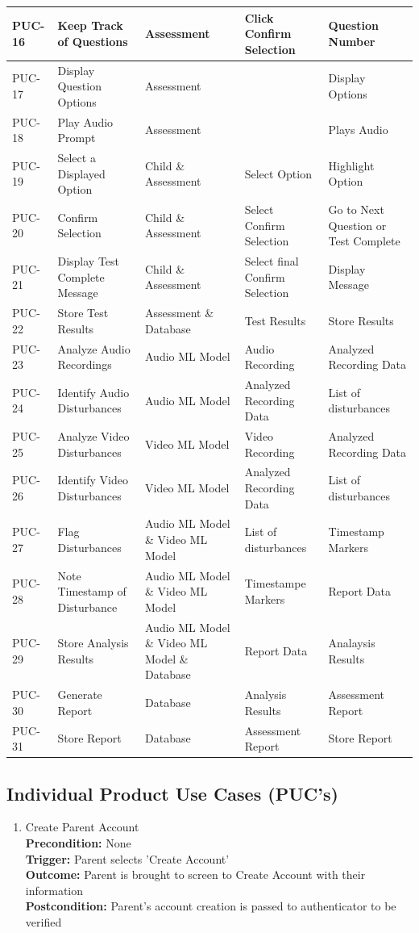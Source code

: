 \documentclass[12pt]{article}
\begin{document}
\begin{longtable}{|p{2cm}|p{3.2cm}|p{3.2cm}|p{3cm}|p{3cm}|}
  \hline
  PUC-16 & Keep Track of Questions & Assessment & Click Confirm Selection& Question Number\\
  \hline
  PUC-17 & Display Question Options & Assessment & & Display Options\\
  \hline
  PUC-18 & Play Audio Prompt & Assessment & & Plays Audio\\
  \hline
  PUC-19 & Select a Displayed Option & Child \& Assessment & Select Option & Highlight Option\\
  \hline
  PUC-20 & Confirm Selection & Child \& Assessment & Select Confirm Selection & Go to Next Question or Test Complete\\
  \hline
  PUC-21 & Display Test Complete Message & Child \& Assessment & Select final Confirm Selection & Display Message\\
  \hline
  PUC-22 & Store Test Results & Assessment \& Database & Test Results & Store Results\\
  \hline
  PUC-23 & Analyze Audio Recordings & Audio ML Model & Audio Recording & Analyzed Recording Data\\
  \hline
  PUC-24 & Identify Audio Disturbances & Audio ML Model & Analyzed Recording Data & List of disturbances\\
  \hline
  PUC-25 & Analyze Video Disturbances & Video ML Model & Video Recording & Analyzed Recording Data\\
  \hline
  PUC-26 & Identify Video Disturbances & Video ML Model & Analyzed Recording Data & List of disturbances\\
  \hline
  PUC-27 & Flag Disturbances & Audio ML Model \& Video ML Model & List of disturbances & Timestamp Markers\\
  \hline
  PUC-28 & Note Timestamp of Disturbance & Audio ML Model \& Video ML Model & Timestampe Markers & Report Data\\
  \hline
  PUC-29 & Store Analysis Results & Audio ML Model \& Video ML Model \& Database & Report Data & Analaysis Results\\
  \hline
  PUC-30 & Generate Report & Database & Analysis Results & Assessment Report\\
  \hline
  PUC-31 & Store Report & Database & Assessment Report & Store Report\\
  \bottomrule
\end{longtable}
\subsection{Individual Product Use Cases (PUC's)}
\begin{enumerate}[{PUC-}01. ]
  \item Create Parent Account\\
  \textbf{Precondition: }None\\
  \textbf{Trigger: }Parent selects 'Create Account'\\
  \textbf{Outcome: }Parent is brought to screen to Create Account with their information\\
  \textbf{Postcondition: } Parent's account creation is passed to authenticator to be verified\\
\end{enumerate}
\end{document}

